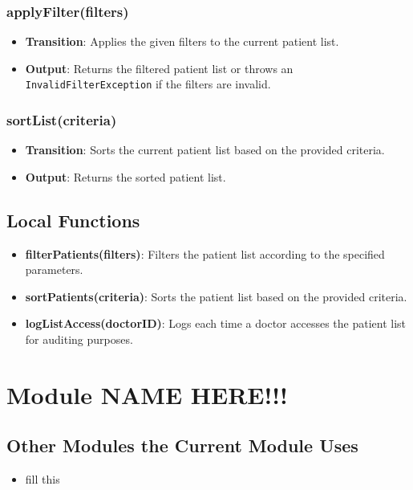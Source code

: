 \documentclass[12pt, titlepage]{article}
\begin{document}
\subsubsection{applyFilter(filters)}

\begin{itemize}
    \item \textbf{Transition}: Applies the given filters to the current patient list.
    \item \textbf{Output}: Returns the filtered patient list or throws an \texttt{InvalidFilterException} if the filters are invalid.
\end{itemize}

\subsubsection{sortList(criteria)}

\begin{itemize}
    \item \textbf{Transition}: Sorts the current patient list based on the provided criteria.
    \item \textbf{Output}: Returns the sorted patient list.
\end{itemize}

\subsection{Local Functions}
\begin{itemize}
\item \textbf{filterPatients(filters)}: Filters the patient list according to the specified parameters.
\item \textbf{sortPatients(criteria)}: Sorts the patient list based on the provided criteria.
\item \textbf{logListAccess(doctorID)}: Logs each time a doctor accesses the patient list for auditing purposes.
\end{itemize}
\section{Module NAME HERE!!!}

\subsection{Other Modules the Current Module Uses}
\begin{itemize}
    \item fill this 
\end{itemize}
\end{document}
